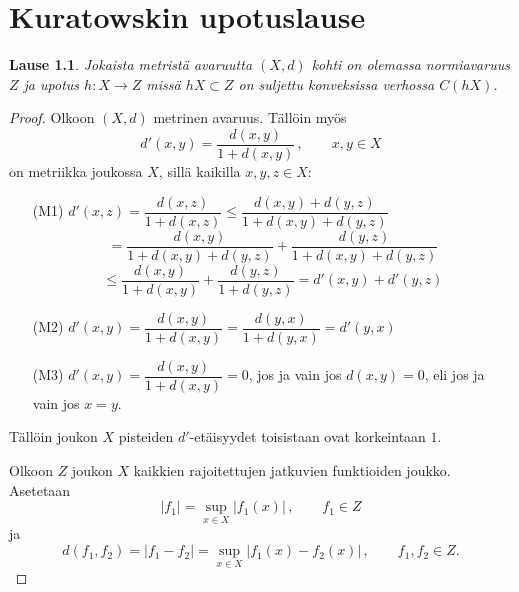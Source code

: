 \documentclass[12pt,a4paper,leqno]{report}
\theoremstyle{plain}
\newtheorem{lause}[equation]{Lause}
\theoremstyle{definition}
\theoremstyle{remark}
\begin{document}
\chapter{Kuratowskin upotuslause}\label{kuratowski}

\begin{lause}
Jokaista metristä avaruutta $(X,d)$ kohti on olemassa normiavaruus $Z$ ja upotus $h\colon X\rightarrow Z$ missä $ hX\subset Z$ on suljettu konveksissa verhossa $C(hX)$. 
\end{lause} 
 

\begin{proof} Olkoon $(X,d)$ metrinen avaruus. Tällöin myös
$$d'(x,y)=\dfrac{d(x,y)}{1+d(x,y)} \, , \qquad x,y\in X$$
on metriikka joukossa $X$, sillä kaikilla $x,y,z\in X$:
\begin{itemize}
\item[(M1)]$d'(x,z)=\dfrac{d(x,z)}{1+d(x,z)}\leq \dfrac{d(x,y)+d(y,z)}{1+d(x,y)+d(y,z)}$
$$= \dfrac{d(x,y)}{1+d(x,y)+d(y,z)}+ \dfrac{d(y,z)}{1+d(x,y)+d(y,z)}$$
$$\leq \dfrac{d(x,y)}{1+d(x,y)}+ \dfrac{d(y,z)}{1+d(y,z)}=d'(x,y)+d'(y,z)$$
\item[(M2)]$d'(x,y)=\dfrac{d(x,y)}{1+d(x,y)}=\dfrac{d(y,x)}{1+d(y,x)}=d'(y,x)$
\item[(M3)]$d'(x,y)=\dfrac{d(x,y)}{1+d(x,y)}=0$, jos ja vain jos $d(x,y)=0$, eli jos ja vain jos $x=y$.
\end{itemize} 
Tällöin joukon $X$ pisteiden $d'$-etäisyydet toisistaan ovat korkeintaan $1$.

Olkoon $Z$ joukon $X$ kaikkien rajoitettujen jatkuvien funktioiden joukko. Asetetaan
$$|f_1|=\sup_{x\in X} |f_1(x)| \, , \qquad f_1\in Z$$
ja
$$d(f_1,f_2)=|f_1-f_2| = \sup_{x\in X} |f_1 (x)-f_2 (x)| \, , \qquad f_1, f_2 \in Z .$$


\end{proof}
\end{document}
